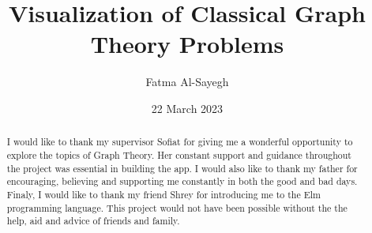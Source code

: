 \documentclass{l4proj}
\begin{document}
\title{Visualization of Classical Graph Theory Problems}
\author{Fatma Al-Sayegh}
\date{22 March 2023}

\maketitle

\begin{abstract}

\end{abstract}

\renewcommand{\abstractname}{Acknowledgements}
\begin{abstract}
 I would like to thank my supervisor Sofiat for giving me a wonderful
    opportunity to explore the topics of Graph Theory. Her constant support and
    guidance throughout the project was essential in building the app. I would
    also like to thank my father for encouraging, believing and supporting me
    constantly in both the good and bad days. Finaly, I would like to thank my
    friend Shrey for introducing me to the Elm programming language. This
    project would not have been possible without the the help, aid and advice
    of friends and family. 
\end{abstract}

%
%
\def\consentname {Fatma Al-Sayegh} %
\def\consentdate {20 November 2022} %
%
\educationalconsent


\tableofcontents
\end{document}
